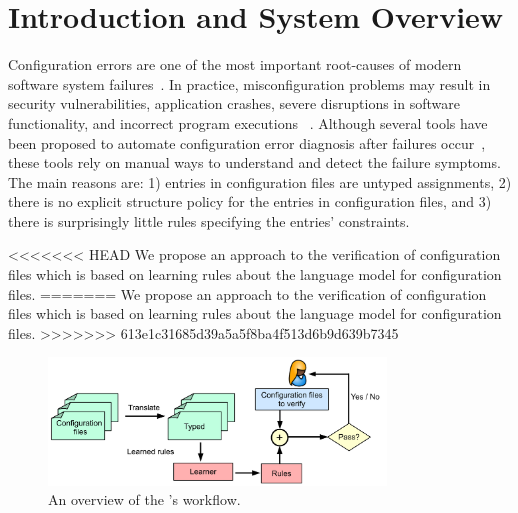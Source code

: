 \section{Introduction and System Overview}
\label{sec:Intro}

Configuration errors are one of the most important root-causes of
modern software system failures~\cite{xu15systems,yin11anempirical}.
In practice, misconfiguration problems may result in security
vulnerabilities, application crashes, severe disruptions in software
functionality, and incorrect program executions%
~\cite{xu15systems,zhang14encore,yuan11context}.  Although several
tools have been proposed to automate configuration error diagnosis
after failures occur~\cite{wang04automatic,attariyan10automating,
su07autobash,whitaker04configuration}, these tools rely on manual ways
  to understand and detect the failure symptoms. The main reasons are:
  1) entries in configuration files are untyped assignments, 2) there
  is no explicit structure policy for the entries in configuration
  files, and 3) there is surprisingly little rules specifying the
  entries' constraints.

<<<<<<< HEAD
We propose an approach to the verification of configuration files
which is based on learning rules about the language model for
configuration files.
=======
We propose an approach to the verification of  
configuration files which is based on learning rules about the language 
model for configuration files. 
>>>>>>> 613e1c31685d39a5a5f8ba4f513d6b9d639b7345

\begin{figure}[t] \centering
\includegraphics[width=0.8\textwidth]{figs/overview}
\caption{An overview of the \app's workflow.}
\label{fig-overview}
\end{figure}

